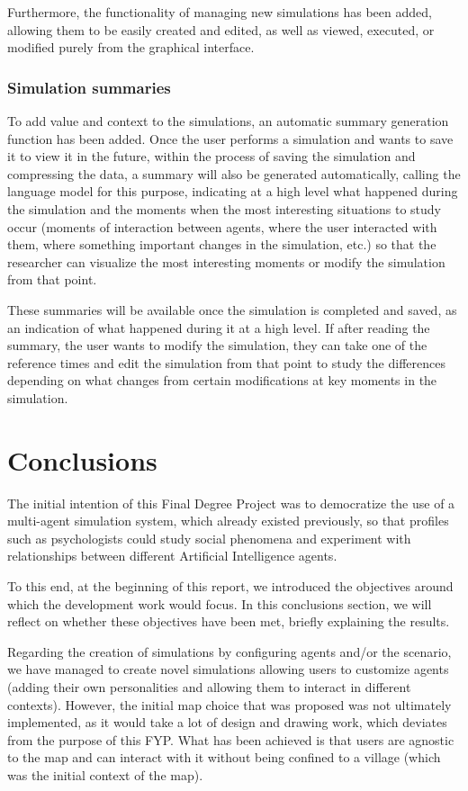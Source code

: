 Furthermore, the functionality of managing new simulations has been added, allowing them to be easily created and edited, as well as viewed, executed, or modified purely from the graphical interface.

\subsubsection{Simulation summaries}

To add value and context to the simulations, an automatic summary generation function has been added. Once the user performs a simulation and wants to save it to view it in the future, within the process of saving the simulation and compressing the data, a summary will also be generated automatically, calling the language model for this purpose, indicating at a high level what happened during the simulation and the moments when the most interesting situations to study occur (moments of interaction between agents, where the user interacted with them, where something important changes in the simulation, etc.) so that the researcher can visualize the most interesting moments or modify the simulation from that point.

These summaries will be available once the simulation is completed and saved, as an indication of what happened during it at a high level. If after reading the summary, the user wants to modify the simulation, they can take one of the reference times and edit the simulation from that point to study the differences depending on what changes from certain modifications at key moments in the simulation.

\section{Conclusions}

The initial intention of this Final Degree Project was to democratize the use of a multi-agent simulation system, which already existed previously, so that profiles such as psychologists could study social phenomena and experiment with relationships between different Artificial Intelligence agents.

To this end, at the beginning of this report, we introduced the objectives around which the development work would focus. In this conclusions section, we will reflect on whether these objectives have been met, briefly explaining the results.

Regarding the creation of simulations by configuring agents and/or the scenario, we have managed to create novel simulations allowing users to customize agents (adding their own personalities and allowing them to interact in different contexts). However, the initial map choice that was proposed was not ultimately implemented, as it would take a lot of design and drawing work, which deviates from the purpose of this FYP. What has been achieved is that users are agnostic to the map and can interact with it without being confined to a village (which was the initial context of the map).


